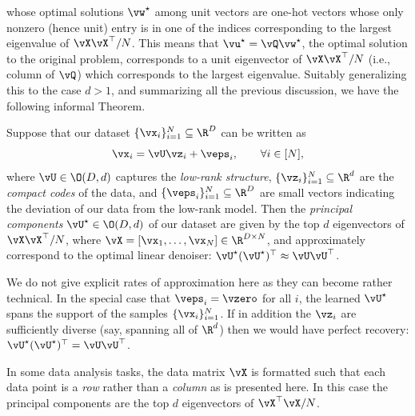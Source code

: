 \documentclass[../../book-main.tex]{subfiles}
\begin{document}
whose optimal solutions \(\vw^{\star}\) among unit vectors are
one-hot vectors whose only nonzero (hence unit) entry is in one of
the indices corresponding to the largest eigenvalue of
\(\vX\vX^{\top}/N\). This means that \(\vu^\star =
\vQ\vw^\star\), the optimal solution to the original problem,
corresponds to a unit eigenvector of \(\vX\vX^{\top}/N\) (i.e.,
column of \(\vQ\)) which corresponds to the largest eigenvalue.
Suitably generalizing this to the case \(d > 1\), and summarizing all
the previous discussion, we have the following informal Theorem.
\begin{theorem}\label{thm:pca}
    Suppose that our dataset \(\{\vx_{i}\}_{i = 1}^{N} \subseteq
    \R^{D}\) can be written as
    \begin{equation}
        \vx_{i} = \vU\vz_{i} + \veps_{i}, \qquad \forall i \in [N],
    \end{equation}
    where \(\vU \in \O(D, d)\) captures the \textit{low-rank structure},
    \(\{\vz_{i}\}_{i = 1}^{N} \subseteq \R^{d}\) are the \textit{compact codes}
    of the data, and \(\{\veps_{i}\}_{i = 1}^{N} \subseteq \R^{D}\) are small
    vectors indicating the deviation of our data from the low-rank model. Then
    the \textit{principal components} \(\vU^{\star} \in \O(D, d)\) of our
    dataset are given by the top \(d\) eigenvectors of \(\vX\vX^{\top}/N\),
    where \(\vX = [\vx_{1}, \dots, \vx_{N}] \in \R^{D \times N}\), and
    approximately correspond to the optimal linear denoiser:
    \(\vU^{\star}(\vU^{\star})^{\top} \approx \vU\vU^{\top}\).
\end{theorem}
We do not give explicit rates of approximation here as they can become rather
technical. In the special case that \(\veps_{i} = \vzero\) for all \(i\), the
learned \(\vU^{\star}\) spans the support of the samples \(\{\vx_{i}\}_{i
= 1}^{N}\). If in addition the \(\vz_{i}\) are sufficiently diverse (say,
spanning all of \(\R^{d}\)) then we would have perfect recovery:
\(\vU^{\star}(\vU^{\star})^{\top} = \vU\vU^{\top}\).

\begin{remark}
    In some data analysis tasks, the data matrix \(\vX\) is formatted
    such that each data point is a \textit{row} rather than a
    \textit{column} as is presented here. In this case the principal
    components are the top \(d\) eigenvectors of \(\vX^{\top}\vX/N\).
\end{remark}
\end{document}
